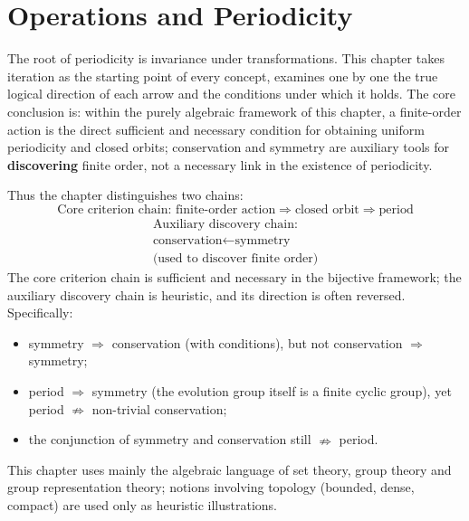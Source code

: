\chapter{Operations and Periodicity}
\label{chap:period_foundation}


\begin{remark}\label{rem:chapter_positioning}
The root of periodicity is invariance under transformations. This chapter takes iteration as the starting point of every concept, examines one by one the true logical direction of each arrow and the conditions under which it holds. The core conclusion is: within the purely algebraic framework of this chapter, a finite-order action is the direct sufficient and necessary condition for obtaining uniform periodicity and closed orbits; conservation and symmetry are auxiliary tools for \textbf{discovering} finite order, not a necessary link in the existence of periodicity.

Thus the chapter distinguishes two chains:
\[
\boxed{\text{Core criterion chain: finite-order action}\Longrightarrow\text{closed orbit}\Longrightarrow\text{period}}
\]
\[
\boxed{\begin{gathered}
\text{Auxiliary discovery chain:}\\
\text{conservation}\longleftarrow\text{symmetry}\\
\text{(used to discover finite order)}
\end{gathered}}
\]
The core criterion chain is sufficient and necessary in the bijective framework; the auxiliary discovery chain is heuristic, and its direction is often reversed. Specifically:
\begin{itemize}
    \item symmetry $\Rightarrow$ conservation (with conditions), but not conservation $\Rightarrow$ symmetry;
    \item period $\Rightarrow$ symmetry (the evolution group itself is a finite cyclic group), yet period $\nRightarrow$ non-trivial conservation;
    \item the conjunction of symmetry and conservation still $\nRightarrow$ period.
\end{itemize}

This chapter uses mainly the algebraic language of set theory, group theory and group representation theory; notions involving topology (bounded, dense, compact) are used only as heuristic illustrations.
\end{remark}

